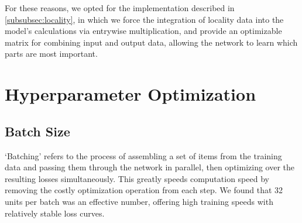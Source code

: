 For these reasons, we opted for the implementation described in 
\ref{subsubsec:locality}, in which we force the integration of locality data 
into the model's calculations via entrywise multiplication, and provide an 
optimizable matrix for combining input and output data, allowing the network to 
learn which parts are most important.

\section{Hyperparameter Optimization}
\subsection{Batch Size}
`Batching' refers to the process of assembling a set of items from the training 
data and passing them through the network in parallel, then optimizing over the 
resulting losses simultaneously. This greatly speeds computation speed by 
removing the costly optimization operation from each step. We found that 32 
units per batch was an effective number, offering high training speeds with 
relatively stable loss curves.
